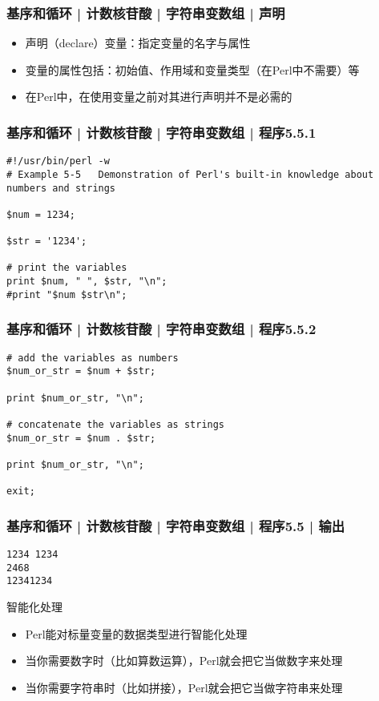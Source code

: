 \begin{frame}[fragile]
  \frametitle{基序和循环 | 计数核苷酸 | 字符串变数组 | 声明}
  \begin{itemize}
    \item 声明（declare）变量：指定变量的名字与属性
    \item 变量的属性包括：初始值、作用域和变量类型（在Perl中不需要）等
    \item 在Perl中，在使用变量之前对其进行声明并不是必需的
  \end{itemize}
\end{frame}

\begin{frame}[fragile]
  \frametitle{基序和循环 | 计数核苷酸 | 字符串变数组 | 程序5.5.1}
\begin{lstlisting}
#!/usr/bin/perl -w
# Example 5-5   Demonstration of Perl's built-in knowledge about numbers and strings

$num = 1234;

$str = '1234';

# print the variables
print $num, " ", $str, "\n";
#print "$num $str\n";
\end{lstlisting}
\end{frame}

\begin{frame}[fragile]
  \frametitle{基序和循环 | 计数核苷酸 | 字符串变数组 | 程序5.5.2}
\begin{lstlisting}[firstnumber=11]
# add the variables as numbers
$num_or_str = $num + $str;

print $num_or_str, "\n";

# concatenate the variables as strings
$num_or_str = $num . $str;

print $num_or_str, "\n";

exit;
\end{lstlisting}
\end{frame}

\begin{frame}[fragile]
  \frametitle{基序和循环 | 计数核苷酸 | 字符串变数组 | 程序5.5 | 输出}
\begin{lstlisting}
1234 1234
2468
12341234
\end{lstlisting}
\pause
\begin{block}{智能化处理}
  \begin{itemize}
    \item Perl能对标量变量的数据类型进行智能化处理
    \item 当你需要数字时（比如算数运算），Perl就会把它当做数字来处理
    \item 当你需要字符串时（比如拼接），Perl就会把它当做字符串来处理
  \end{itemize}
\end{block}
\end{frame}

